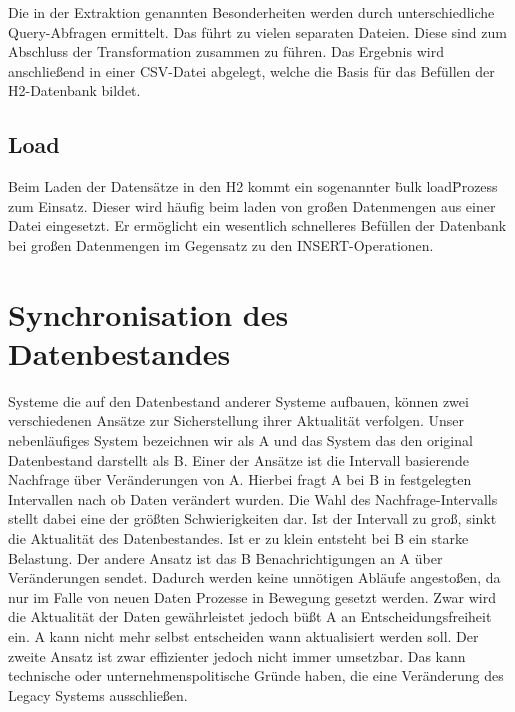 Die in der Extraktion genannten Besonderheiten werden durch unterschiedliche Query-Abfragen ermittelt. Das führt zu vielen separaten Dateien. Diese sind zum Abschluss der Transformation zusammen zu führen. Das Ergebnis wird anschließend in einer CSV-Datei abgelegt, welche die Basis für das Befüllen der H2-Datenbank bildet. 

\subsection{Load}

Beim Laden der Datensätze in den H2 kommt ein sogenannter \"bulk load\" Prozess zum Einsatz. Dieser wird häufig beim laden von großen Datenmengen aus einer Datei eingesetzt. Er ermöglicht ein wesentlich schnelleres Befüllen der Datenbank bei großen Datenmengen im Gegensatz zu den INSERT-Operationen.

\section{Synchronisation des Datenbestandes}

Systeme die auf den Datenbestand anderer Systeme aufbauen, können zwei verschiedenen Ansätze zur Sicherstellung ihrer Aktualität verfolgen. Unser nebenläufiges System bezeichnen wir als A und das System das den original Datenbestand darstellt als B. Einer der Ansätze ist die Intervall basierende Nachfrage über Veränderungen von A. Hierbei fragt A bei B in festgelegten Intervallen nach ob Daten verändert wurden. Die Wahl des Nachfrage-Intervalls stellt dabei eine der größten Schwierigkeiten dar. Ist der Intervall zu groß, sinkt die Aktualität des Datenbestandes. Ist er zu klein entsteht bei B ein starke Belastung. Der andere Ansatz ist das B Benachrichtigungen an A über Veränderungen sendet. Dadurch werden keine unnötigen Abläufe angestoßen, da nur im Falle von neuen Daten Prozesse in Bewegung gesetzt werden. Zwar wird die Aktualität der Daten gewährleistet jedoch büßt A an Entscheidungsfreiheit ein. A kann nicht mehr selbst entscheiden wann aktualisiert werden soll. Der zweite Ansatz ist zwar effizienter jedoch nicht immer umsetzbar. Das kann technische oder unternehmenspolitische Gründe haben, die eine Veränderung des Legacy Systems ausschließen.  

